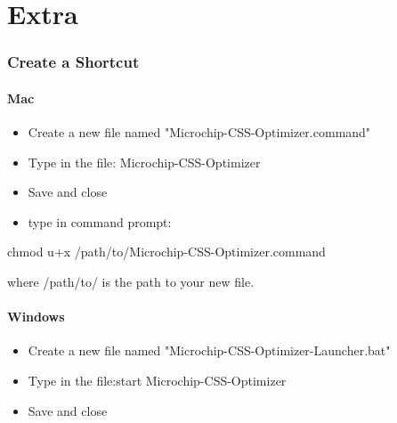 \documentclass[10pt,letterpaper]{article}
\begin{document}
\part {Extra}
\setcounter{section}{0}
\section {Create a Shortcut}
\subsection{Mac}
\begin{itemize}
\item Create a new file named "Microchip-CSS-Optimizer.command"
\item Type in the file: Microchip-CSS-Optimizer
\item Save and close
\item type in command prompt:
\end{itemize}
\begin{mdframed}[backgroundcolor=black, fontcolor=white]
chmod u+x /path/to/Microchip-CSS-Optimizer.command
\end{mdframed}
where /path/to/ is the path to your new file.

\subsection{Windows}
\begin{itemize}
\item Create a new file named "Microchip-CSS-Optimizer-Launcher.bat"
\item Type in the file:start Microchip-CSS-Optimizer
\item Save and close
\end{itemize}
\end{document}
